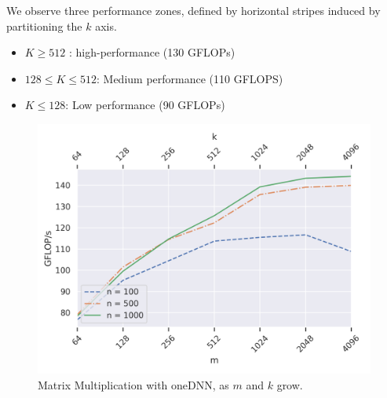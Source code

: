  We observe three performance zones, defined by horizontal stripes induced by partitioning the $k$ axis.
\begin{itemize}
	\item $K \geq 512$ : high-performance (130 GFLOPs)
	\item $128 \leq K \leq 512$: Medium performance (110 GFLOPS)
	\item $K \leq 128$: Low performance (90 GFLOPs)
\end{itemize}




\begin{figure}	
	\centering
	\includegraphics[width=\columnwidth]{imgs/DNNL_different_N.png}
	\caption{Matrix Multiplication with oneDNN, as $m$ and $k$ grow.  }
	\label{fig:onednnl_no_r}
\end{figure}

